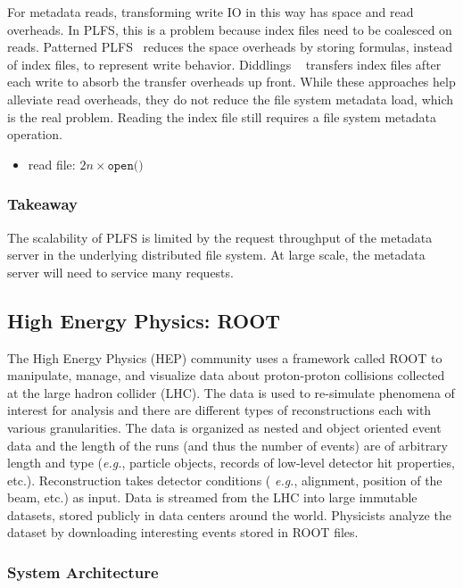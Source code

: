 For metadata reads, transforming write IO in this way has space and read
overheads. In PLFS, this is a problem because index files need to be coalesced
on reads.  Patterned PLFS~\cite{he:hpdc13-plfs-patterns} reduces the space
overheads by storing formulas, instead of index files, to represent write
behavior. Diddlings ~\cite{grider:pc17-diddlings} transfers index files after
each write to absorb the transfer overheads up front. While these approaches
help alleviate read overheads, they do not reduce the file system metadata
load, which is the real problem. Reading the index file still requires a file
system metadata operation.

\begin{itemize}
  \item read file: \(2n \times \texttt{open()}\) 
\end{itemize}

\subsubsection*{Takeaway} The scalability of PLFS is limited by the request
throughput of the metadata server in the underlying distributed file system. At
large scale, the metadata server will need to service many requests.

\subsection{High Energy Physics: ROOT}

The High Energy Physics (HEP) community uses a framework called ROOT to
manipulate, manage, and visualize data about proton-proton collisions collected
at the large hadron collider (LHC). The data is used to re-simulate phenomena
of interest for analysis and there are different types of reconstructions each
with various granularities. The data is organized as nested and object oriented
event data and the length of the runs (and thus the number of events) are of
arbitrary length and type ({\it e.g.}, particle objects, records of low-level
detector hit properties, etc.).  Reconstruction takes detector conditions ({\it
e.g.}, alignment, position of the beam, etc.) as input.  Data is streamed from
the LHC into large immutable datasets, stored publicly in data centers around
the world.  Physicists analyze the dataset by downloading interesting events
stored in ROOT files.

\subsubsection{System Architecture}

